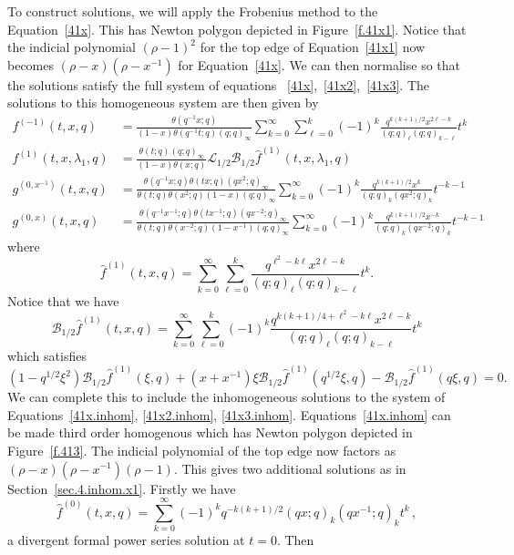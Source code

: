 \documentclass[12pt,reqno]{amsart}
\theoremstyle{definition}
\def\be{\begin{equation}}
\def\ee{\end{equation}}
\def\Bor{\mathcal{B}}
\def\Lap{\mathcal{L}}
\def\rind{\rho}
\begin{document}
To construct solutions, we will apply the Frobenius method to the
Equation~\eqref{41x}. This has Newton polygon depicted in Figure~\ref{f.41x1}.
Notice that the indicial polynomial $(\rind-1)^2$ for the top edge of
Equation~\eqref{41x1} now becomes $(\rind-x)(\rind-x^{-1})$ for Equation~\eqref{41x}.
We can then normalise so that the solutions satisfy the full system of equations
~\eqref{41x},~\eqref{41x2},~\eqref{41x3}. The solutions to this homogeneous
system are then given by
\be
\label{sols.41.x}
\begin{aligned}
f^{(-1)}(t,x,q)
&=
\frac{\theta(q^{-1}x;q)}{(1-x)\theta(q^{-1}t;q)(q;q)_{\infty}}\sum_{k=0}^{\infty}
\sum_{\ell=0}^{k}(-1)^{k}\frac{q^{k(k+1)/2}x^{2\ell-k}}{(q;q)_{\ell}
  (q;q)_{k-\ell}}t^{k}\\
f^{(1)}(t,x,\lambda_{1},q)
&=
\frac{\theta(t;q)(q;q)_{\infty}}{(1-x)\theta(x;q)}
\Lap_{1/2}\Bor_{1/2}\hat{f}^{(1)}(t,x,\lambda_{1},q)\\
g^{(0,x^{-1})}(t,x,q)
&=
\frac{\theta(q^{-1}x;q)\theta(tx;q)(qx^{2};q)_{\infty}}{\theta(t;q)
  \theta(x^{2};q)(1-x)(q;q)_{\infty}}\sum_{k=0}^{\infty}(-1)^{k}
\frac{q^{k(k+1)/2}x^{k}}{(q;q)_{k}(qx^{2};q)_{k}}t^{-k-1}\\
g^{(0,x)}(t,x,q)
&=
\frac{\theta(q^{-1}x^{-1};q)\theta(tx^{-1};q)(qx^{-2};q)_{\infty}}{\theta(t;q)
  \theta(x^{-2};q)(1-x^{-1})(q;q)_{\infty}}\sum_{k=0}^{\infty}(-1)^{k}
\frac{q^{k(k+1)/2}x^{-k}}{(q;q)_{k}(qx^{-2};q)_{k}}t^{-k-1}
\end{aligned}
\ee
where
\be
\hat{f}^{(1)}(t,x,q)
=
\sum_{k=0}^{\infty}\sum_{\ell=0}^{k}\frac{q^{\ell^{2}-k\ell}
  x^{2\ell-k}}{(q;q)_{\ell}(q;q)_{k-\ell}}t^{k}.
\ee
Notice that we have
\be
\Bor_{1/2}\hat{f}^{(1)}(t,x,q)
=
\sum_{k=0}^{\infty}\sum_{\ell=0}^{k}(-1)^{k}
\frac{q^{k(k+1)/4+\ell^{2}-k\ell}x^{2\ell-k}}{(q;q)_{\ell}(q;q)_{k-\ell}}t^{k}
\ee
which satisfies
\be
(1-q^{1/2}\xi^2)\Bor_{1/2}\hat{f}^{(1)}(\xi,q)+
(x+x^{-1})\xi\Bor_{1/2}\hat{f}^{(1)}(q^{1/2}\xi,q)-\Bor_{1/2}
\hat{f}^{(1)}(q\xi,q)=0.
\ee
We can complete this to include the inhomogeneous solutions to the system of
Equations~\eqref{41x.inhom}, \eqref{41x2.inhom}, \eqref{41x3.inhom}.
Equations~\eqref{41x.inhom} can be made third order homogenous which has
Newton polygon depicted in Figure~\ref{f.413}. The indicial polynomial of
the top edge now factors as $(\rind-x)(\rind-x^{-1})(\rind-1)$.
This gives two additional solutions as in Section~\ref{sec.4.inhom.x1}.
Firstly we have
\be
\hat{f}^{(0)}(t,x,q)=\sum_{k=0}^{\infty}(-1)^{k}q^{-k(k+1)/2}
(qx;q)_{k}(qx^{-1};q)_{k}t^{k} \,,
\ee
a divergent formal power series solution at $t=0$. Then
\end{document}
